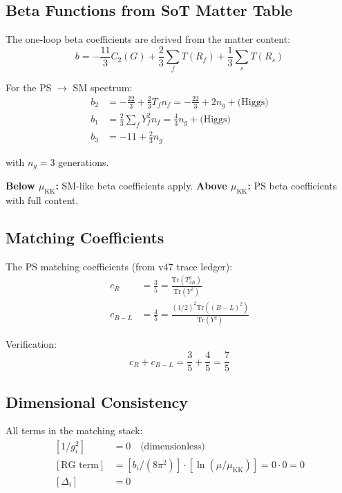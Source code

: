\documentclass[11pt,a4paper]{article}
\begin{document}
\subsection{Beta Functions from SoT Matter Table}
\label{subsec:beta-functions}

The one-loop beta coefficients are derived from the matter content:
\begin{equation}
\label{eq:beta-general}
b = -\frac{11}{3}C_2(G) + \frac{2}{3}\sum_f T(R_f) + \frac{1}{3}\sum_s T(R_s)
\end{equation}

For the PS $\to$ SM spectrum:
\begin{align}
\label{eq:b2-value}
b_2 &= -\frac{22}{3} + \frac{2}{3}T_f n_f = -\frac{22}{3} + 2n_g + \text{(Higgs)} \\
\label{eq:b1-value}
b_1 &= \frac{2}{3}\sum_f Y_f^2 n_f = \frac{4}{3}n_g + \text{(Higgs)} \\
\label{eq:b3-value}
b_3 &= -11 + \frac{2}{3}n_g
\end{align}

with $n_g = 3$ generations.

\textbf{Below $\mu_{\text{KK}}$:} SM-like beta coefficients apply.
\textbf{Above $\mu_{\text{KK}}$:} PS beta coefficients with full content.

\subsection{Matching Coefficients}
\label{subsec:matching-coeffs}

The PS matching coefficients (from v47 trace ledger):
\begin{align}
\label{eq:c-R}
c_R &= \frac{3}{5} = \frac{\text{Tr}(T_{3R}^2)}{\text{Tr}(Y^2)} \\
\label{eq:c-BL}
c_{B-L} &= \frac{4}{5} = \frac{(1/2)^2 \text{Tr}((B-L)^2)}{\text{Tr}(Y^2)}
\end{align}

Verification:
\begin{equation}
\label{eq:coeff-sum}
c_R + c_{B-L} = \frac{3}{5} + \frac{4}{5} = \frac{7}{5}
\end{equation}

\subsection{Dimensional Consistency}
\label{subsec:dim-consistency}

All terms in the matching stack:
\begin{align}
\label{eq:dim-g-inverse}
[1/g_i^2] &= 0 \quad \text{(dimensionless)} \\
\label{eq:dim-rg-term}
[\text{RG term}] &= [b_i/(8\pi^2)] \cdot [\ln(\mu/\mu_{\text{KK}})] = 0 \cdot 0 = 0 \\
\label{eq:dim-threshold}
[\Delta_i] &= 0
\end{align}
\end{document}

